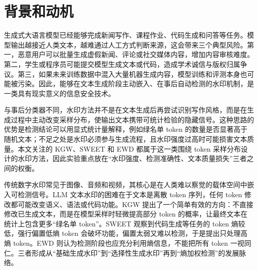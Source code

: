 \documentclass{SYSUReport}
\date{\today}
\begin{document}
\cover
\thispagestyle{empty}
\clearpage
{}
\setcounter{page}{1}

\begin{abstract}
大语言模型生成文本的自动化能力正在快速提升，随之而来的学术诚信、虚假信息生成和合成数据污染等问题，使文本水印成为信息安全领域的重要研究方向。本文围绕三种代表性 LLM 水印方案展开复现与对比：KGW 通过伪随机绿名单和 logit 偏置在生成阶段嵌入统计信号；SWEET 针对代码等低熵场景，只在高熵 token 上嵌入和检测水印；EWD 则在检测阶段引入熵加权统计量，为高熵 token 分配更高权重。实验实现了从数据读取、模型生成、水印嵌入、水印检测、perplexity 评估到结果作图的完整链路。正式云端实验使用 OPT-1.3B 生成、OPT-6.7B 计算 PPL，在 C4 RealNewsLike 500 条新闻文本和 HumanEval 低熵代码任务上评估三种方法。结果表明，三种方法均能有效区分 human 与 watermarked 文本；SWEET 在保持高检测性能的同时带来更低 PPL 增量；EWD 适合作为 KGW 生成文本的增强检测器，但本身不是独立生成水印方案。
\end{abstract}

\section{背景和动机}
生成式大语言模型已经能够完成新闻写作、课程作业、代码生成和问答等任务。模型输出越接近人类文本，越难通过人工方式判断来源，这会带来三个典型风险。第一，恶意用户可以批量生成虚假新闻、评论或社交媒体内容，增加内容审核难度。第二，学生或程序员可能提交模型生成文本或代码，造成学术诚信与版权归属争议。第三，如果未来训练数据中混入大量机器生成内容，模型训练和评测本身也可能被污染。因此，能够在文本生成阶段主动嵌入、在事后自动检测的水印机制，是一类具有现实意义的信息安全技术。

与事后分类器不同，水印方法并不是在文本生成后再尝试识别写作风格，而是在生成过程中主动改变采样分布，使输出文本携带可统计检验的隐藏信号。这种思路的优势是检测结论可以用显式统计量解释，例如绿名单 token 的数量是否显著高于随机文本；不足之处是水印必须参与生成流程，且水印强度过高时可能损害文本质量。本文关注的 KGW、SWEET 和 EWD 都属于这一类围绕 token 采样分布设计的水印方法，因此实验重点放在“水印强度、检测准确性、文本质量损失”三者之间的权衡。

传统数字水印常见于图像、音频和视频，其核心是在人类难以察觉的载体空间中嵌入可检测信号。LLM 文本水印的困难在于文本是离散 token 序列，任何 token 修改都可能改变语义、语法或代码功能。KGW \cite{kirchenbauer2023watermark} 提出了一个简单有效的方向：不直接修改已生成文本，而是在模型采样时轻微提高部分 token 的概率，让最终文本在统计上包含更多“绿名单 token”。SWEET \cite{lee2024sweet} 观察到代码生成等任务的 token 熵较低，强行偏置低熵 token 会破坏功能，偏置太弱又难以检测，于是提出只处理高熵 token。EWD \cite{lu2024ewd} 则认为检测阶段也应充分利用熵信息，不能把所有 token 一视同仁。三者形成从“基础生成水印”到“选择性生成水印”再到“熵加权检测”的发展脉络。
\end{document}

